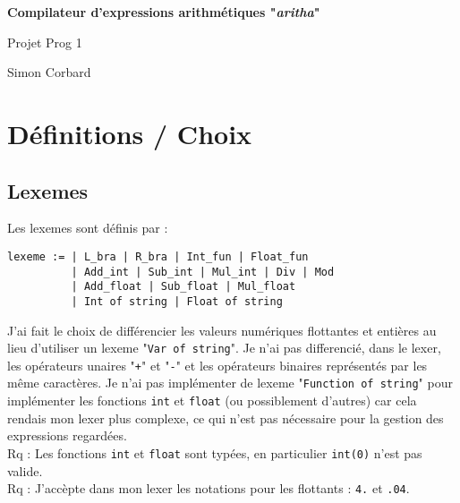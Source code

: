 \documentclass[11pt,a4paper]{article}
\begin{document}
\begin{titlepage}

\vspace{1cm}

	\begin{center}

		\huge{\textbf{Compilateur d'expressions arithmétiques "\textit{aritha}"}}

		\vspace{5mm} %

		\begin{large}

		Projet Prog 1

		\vspace{5mm}

		Simon Corbard

		\end{large}

	\end{center}

\vfill

\tableofcontents

\end{titlepage}

\section{Définitions / Choix}

\subsection{Lexemes}

Les lexemes sont définis par :


\begin{verbatim}
lexeme := | L_bra | R_bra | Int_fun | Float_fun
          | Add_int | Sub_int | Mul_int | Div | Mod
          | Add_float | Sub_float | Mul_float
          | Int of string | Float of string
\end{verbatim}

J'ai fait le choix de différencier les valeurs numériques flottantes et entières au lieu d'utiliser un lexeme "\verb|Var of string|". Je n'ai pas differencié, dans le lexer, les opérateurs unaires "\verb|+|" et "\verb|-|" et les opérateurs binaires représentés par les même caractères. Je n'ai pas implémenter de lexeme "\verb|Function of string|" pour implémenter les fonctions \verb|int| et \verb|float| (ou possiblement d'autres) car cela rendais mon lexer plus complexe, ce qui n'est pas nécessaire pour la gestion des expressions regardées.\\
Rq : Les fonctions \verb|int| et \verb|float| sont typées, en particulier \verb|int(0)| n'est pas valide.\\
Rq : J'accèpte dans mon lexer les notations pour les flottants : \verb|4.| et \verb|.04|.
\end{document}
